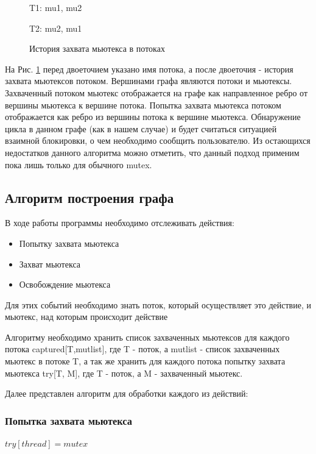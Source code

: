 \begin{figure}[h]
T1: mu1, mu2

T2: mu2, mu1
\caption{История захвата мьютекса в потоках}
\label{fig:mutex-algo}
\end{figure}

На Рис. \ref{fig:mutex-algo} перед двоеточием указано имя потока, а после двоеточия - история захвата мьютексов потоком. Вершинами графа являются потоки и мьютексы. Захваченный потоком мьютекс отображается на графе как направленное ребро от вершины мьютекса к вершине потока. Попытка захвата мьютекса потоком отображается как ребро из вершины потока к вершине мьютекса. Обнаружение цикла в данном графе (как в нашем случае) и будет считаться ситуацией взаимной блокировки, о чем необходимо сообщить пользователю. Из остающихся недостатков данного алгоритма можно отметить, что данный подход применим пока лишь только для обычного mutex.

\subsection{Алгоритм построения графа}

В ходе работы программы необходимо отслеживать действия:
\begin{itemize}
  \item Попытку захвата мьютекса
  \item Захват мьютекса
  \item Освобождение мьютекса
\end{itemize}

Для этих событий необходимо знать поток, который осуществляет это действие, и мьютекс, над которым происходит действие

Алгоритму необходимо хранить список захваченных мьютексов для каждого потока captured[T,mutlist], где T - поток, а mutlist - список захваченных мьютекс в потоке T, а так же хранить для каждого потока попытку захвата мьютекса try[T, M], где T - поток, а M - захваченный мьютекс.

Далее представлен алгоритм для обработки каждого из действий:

\subsubsection{Попытка захвата мьютекса}
\begin{algorithmic}
    \State $try[thread] = mutex$
\EndFunction
\end{algorithmic}

